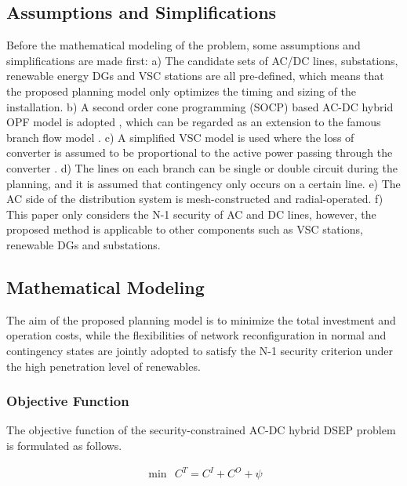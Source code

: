 \documentclass[a4paper,fleqn]{cas-dc}
\begin{document}
\subsection{Assumptions and Simplifications}

Before the mathematical modeling of the problem, some assumptions and 
simplifications are made first: 
a) The candidate sets of AC/DC lines, substations, renewable energy DGs and VSC 
stations are all pre-defined, which means that the proposed planning model 
only optimizes the timing and sizing of the installation.
b) A second order cone programming (SOCP) based AC-DC hybrid OPF model is 
adopted \cite{Ergun_2019_Optimal}, which can be regarded as an extension to 
the famous branch flow model \cite{Farivar_2013_Branch}. 
c) A simplified VSC model is used where the loss of converter is assumed to 
be proportional to the active power passing through the converter 
\cite{Baradar_2013_Second}. 
d) The lines on each branch can be single or double circuit during the 
planning, and it is assumed that contingency only occurs on a certain line.
e) The AC side of the distribution system is mesh-constructed and 
radial-operated. 
f) This paper only considers the N-1 security of AC and DC 
lines, however, the proposed method is applicable to other components such 
as VSC {\color{blue}stations}, renewable DGs and substations.

\subsection{Mathematical Modeling}

The aim of the proposed planning model is to minimize the 
{\color{blue}
total investment and operation costs, while the flexibilities of network 
reconfiguration in normal and contingency states are jointly adopted to 
satisfy the N-1 security criterion under the high penetration level of 
renewables.
}

{\color{blue}
\subsubsection{Objective Function}

The objective function of the security-constrained AC-DC hybrid DSEP problem is 
formulated as follows.
}
\begin{align}
    \label{obj}
    \min \ \ 
    C^{T} = C^{I} + C^{O} + \psi
\end{align}
\end{document}
